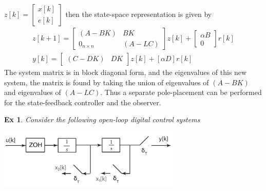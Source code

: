 \documentclass[twoside]{article}
\newtheorem{exmp}[theorem]{Ex}
\begin{document}
$z[k] = \left[ \begin{array}{c} x[k] \\ e[k] \end{array} \right]$
then the state-space representation is given by
%
\begin{align*}
  z[k+1] = \left[ \begin{array}{cc} (A - B K) & B K\\ 0_{n \times n}
                                              & (A - LC) \end{array}
                                                \right] z[k] + \left[ \begin{array}{c} \alpha B \\ 0 \end{array} \right] r[k]
\\
 y[k] = \left[ \begin{array}{cc} (C - D K) & D K \end{array}
                                                \right] z[k] + [\alpha D] r[k]
\end{align*}
%
The system matrix is in block diagonal form, and the eigenvalues
of this new system, the matrix is found by taking the union of eigenvalues
of $(A - B K)$ and eigenvalues of $(A - L C)$. Thus a separate
pole-placement can be performed for the state-feedback controller
and the observer. 

\begin{exmp}
Consider the following open-loop digital control systems
\end{exmp}

    \begin{center}
  \begin{minipage}[h]{0.9\linewidth}
    \begin{center}
      \includegraphics[width=0.65\textwidth]{block_open-loop}
    \end{center}
  \end{minipage}
    \end{center}
\end{document}
